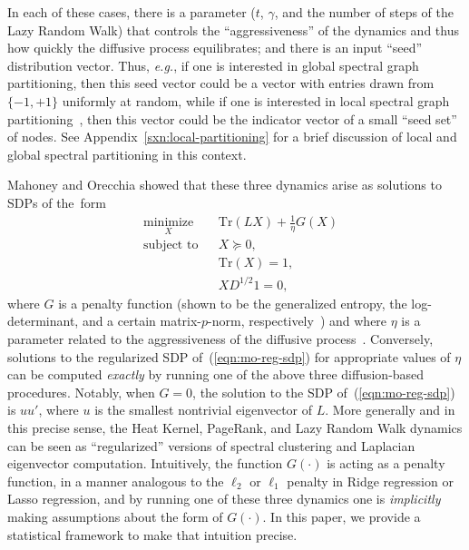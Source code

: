 \documentclass[12pt]{article}
\theoremstyle{plain}
\begin{document}
In each of these cases, there is a parameter ($t$, $\gamma$, and the number 
of steps of the Lazy Random Walk) that controls the ``aggressiveness'' of 
the dynamics and thus how quickly the diffusive process equilibrates; and 
there is an input ``seed'' distribution vector.
Thus, \emph{e.g.}, if one is interested in global spectral graph 
partitioning, then this seed vector could be a vector with entries drawn 
from $\{-1,+1\}$ uniformly at random, while if one is interested in local 
spectral graph 
partitioning~\cite{Spielman:2004,andersen06local,Chung07_heatkernelPNAS,MOV09_TRv2},
then this vector could be the indicator vector of a small ``seed set'' of 
nodes.
See Appendix~\ref{sxn:local-partitioning} for a brief discussion of local 
and global spectral partitioning in this context. 

Mahoney and Orecchia showed that these three dynamics arise as solutions to 
SDPs of the~form
\begin{equation}
\begin{aligned}
  & \underset{X}{\text{minimize}}
  & & \mathrm{Tr}(L X) + \tfrac{1}{\eta} G(X) \\
  & \text{subject to}
  & & X \succeq 0, \\
  & & & \mathrm{Tr}(X) = 1, \\
  & & & X D^{1/2} 1 = 0,
\end{aligned}
\label{eqn:mo-reg-sdp}
\end{equation}
where $G$ is a penalty function (shown to be the 
generalized entropy, the log-determinant, and a certain matrix-$p$-norm, 
respectively~\cite{MO11-implementing}) and where $\eta$ is a 
parameter related to the aggressiveness of the diffusive 
process~\cite{MO11-implementing}.  
Conversely, solutions to the regularized SDP of~(\ref{eqn:mo-reg-sdp}) for 
appropriate values of $\eta$ can be computed \emph{exactly} by running one 
of the above three diffusion-based procedures.
Notably, when $G = 0$, the solution to the SDP 
of~(\ref{eqn:mo-reg-sdp}) is $u u'$, where $u$ is the smallest nontrivial 
eigenvector of $L$.  
More generally and in this precise sense, the Heat Kernel, PageRank, and Lazy 
Random Walk dynamics can be seen as ``regularized'' versions of spectral 
clustering and Laplacian eigenvector computation.
Intuitively, the function $G(\cdot)$ is acting as a penalty function, in a 
manner analogous to the $\ell_2$ or $\ell_1$ penalty in Ridge regression or 
Lasso regression, and by running one of these three dynamics one is 
\emph{implicitly} making assumptions about the form of $G(\cdot)$.
In this paper, we provide a statistical framework to make that intuition 
precise.
\end{document}
